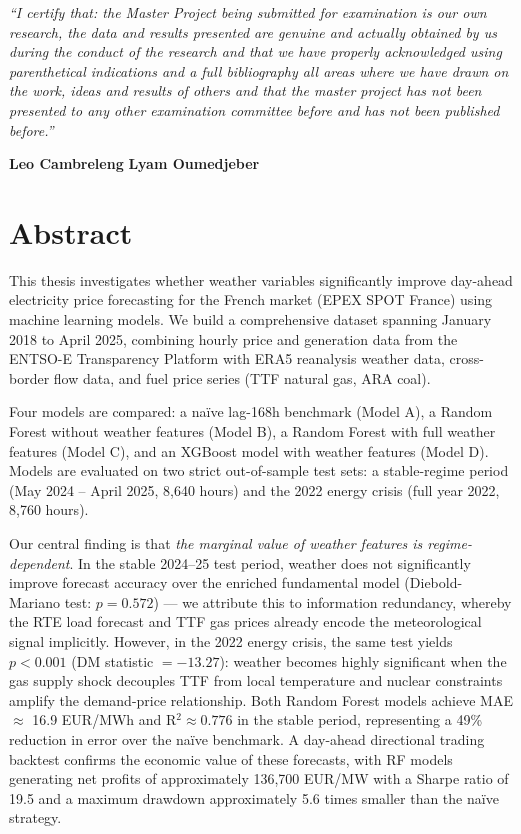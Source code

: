 \documentclass[12pt, a4paper, oneside]{report}
\begin{document}
\vspace{2cm}

\noindent\textit{``I certify that: the Master Project being submitted for examination is our own research, the data and results presented are genuine and actually obtained by us during the conduct of the research and that we have properly acknowledged using parenthetical indications and a full bibliography all areas where we have drawn on the work, ideas and results of others and that the master project has not been presented to any other examination committee before and has not been published before.''}

\vspace{2cm}
\noindent\textbf{Leo Cambreleng} \hfill \textbf{Lyam Oumedjeber}
\clearpage

\chapter*{Abstract}

This thesis investigates whether weather variables significantly improve
day-ahead electricity price forecasting for the French market (EPEX SPOT
France) using machine learning models. We build a comprehensive dataset
spanning January 2018 to April 2025, combining hourly price and generation
data from the ENTSO-E Transparency Platform with ERA5 reanalysis weather data,
cross-border flow data, and fuel price series (TTF natural gas, ARA coal).

Four models are compared: a na\"{i}ve lag-168h benchmark (Model A), a Random
Forest without weather features (Model B), a Random Forest with full weather
features (Model C), and an XGBoost model with weather features (Model D).
Models are evaluated on two strict out-of-sample test sets: a stable-regime
period (May 2024 -- April 2025, 8,640 hours) and the 2022 energy crisis
(full year 2022, 8,760 hours).

Our central finding is that \textit{the marginal value of weather features
is regime-dependent}. In the stable 2024--25 test period, weather does not
significantly improve forecast accuracy over the enriched fundamental model
(Diebold-Mariano test: $p = 0.572$) — we attribute this to information
redundancy, whereby the RTE load forecast and TTF gas prices already encode
the meteorological signal implicitly. However, in the 2022 energy crisis, the
same test yields $p < 0.001$ (DM statistic $= -13.27$): weather becomes
highly significant when the gas supply shock decouples TTF from local
temperature and nuclear constraints amplify the demand-price relationship.
Both Random Forest models achieve MAE $\approx$ 16.9 EUR/MWh and
R$^2 \approx 0.776$ in the stable period, representing a 49\% reduction in
error over the na\"{i}ve benchmark. A day-ahead directional trading backtest
confirms the economic value of these forecasts, with RF models generating net
profits of approximately 136,700 EUR/MW with a Sharpe ratio of 19.5 and a
maximum drawdown approximately 5.6 times smaller than the na\"{i}ve strategy.
\end{document}
